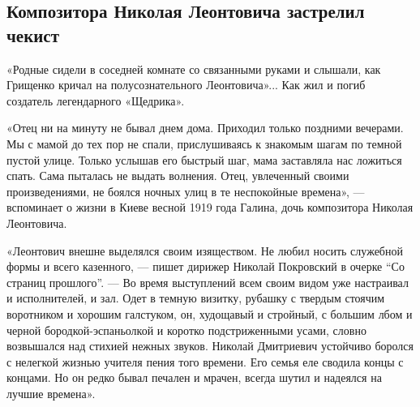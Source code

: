  
 
 
 
 
 
\subsection{Композитора Николая Леонтовича застрелил чекист}
\label{sec:16_12_2017.news.ua.argumentua.1.leontovych_mykola_chekist_smert}



«Родные сидели в соседней комнате со связанными руками и слышали, как Грищенко
кричал на полусознательного Леонтовича»... Как жил и погиб создатель
легендарного «Щедрика».

«Отец ни на минуту не бывал днем дома. Приходил только поздними вечерами. Мы с
мамой до тех пор не спали, прислушиваясь к знакомым шагам по темной пустой
улице. Только услышав его быстрый шаг, мама заставляла нас ложиться спать. Сама
пыталась не выдать волнения. Отец, увлеченный своими произведениями, не боялся
ночных улиц в те неспокойные времена», — вспоминает о жизни в Киеве весной
1919 года Галина, дочь композитора Николая Леонтовича.

«Леонтович внешне выделялся своим изяществом. Не любил носить служебной формы и
всего казенного, — пишет дирижер Николай Покровский в очерке \enquote{Со страниц
прошлого}. — Во время выступлений всем своим видом уже настраивал и
исполнителей, и зал. Одет в темную визитку, рубашку с твердым стоячим
воротником и хорошим галстуком, он, худощавый и стройный, с большим лбом и
черной бородкой-эспаньолкой и коротко подстриженными усами, словно возвышался
над стихией нежных звуков. Николай Дмитриевич устойчиво боролся с нелегкой
жизнью учителя пения того времени. Его семья еле сводила концы с концами. Но он
редко бывал печален и мрачен, всегда шутил и надеялся на лучшие времена».

